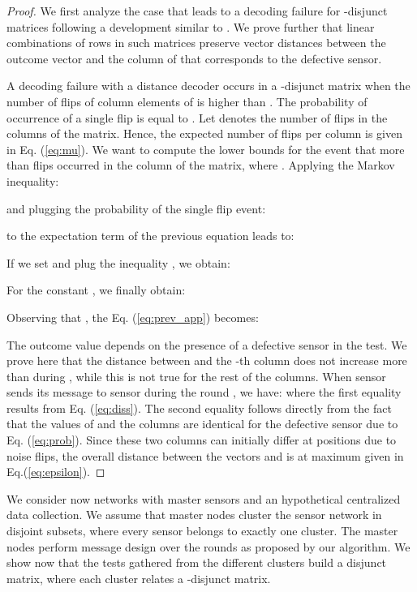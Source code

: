\documentclass[journal]{IEEEtran}
\begin{document}
\begin{proof}
We first analyze the case that leads to a decoding failure for -disjunct matrices following a development similar to \cite{Cheraghchi:11}. We prove further that linear combinations of rows in such matrices preserve vector distances between the outcome vector and the column of  that corresponds to the defective sensor. 

A decoding failure with a distance decoder occurs in a -disjunct matrix when the number of flips of column elements of  is higher than . The probability of  occurrence of a single flip is equal to . Let  denotes the number of flips in the columns of the matrix. Hence, the expected number of flips per column is given in Eq. (\ref{eq:mu}). We want to compute the lower bounds for the event that more than  flips occurred in the column of the matrix, where . Applying the Markov inequality:

and plugging the probability of the single flip event:

to the expectation term of the previous equation leads to: 

If we set  and plug the inequality , we obtain:

For the constant , we finally obtain:

Observing that , the Eq. (\ref{eq:prev_app}) becomes:

 
The outcome value  depends on the presence of a defective sensor  in the test. We prove here that the distance between  and the -th column  does not increase more than  during , while this is not true for the rest of the columns. When sensor  sends its message to sensor  during the round , we have:
{\small
 }
where the first equality results from Eq. (\ref{eq:diss}). The second equality follows directly from the fact that the values of  and the columns  are identical for the defective sensor due to Eq. (\ref{eq:prob}). Since these two columns can initially differ at  positions due to noise flips, the overall distance between the vectors  and  is at maximum  given in Eq.(\ref{eq:epsilon}).
\end{proof}
We consider now networks with  master sensors and an hypothetical centralized data collection. We assume that  master nodes cluster the sensor network in disjoint subsets, where every sensor belongs to exactly one cluster. The master nodes perform message design over the rounds  as proposed by our algorithm. We show now that the tests gathered from the  different clusters build a disjunct matrix, where each cluster relates a -disjunct matrix. 
\end{document}
